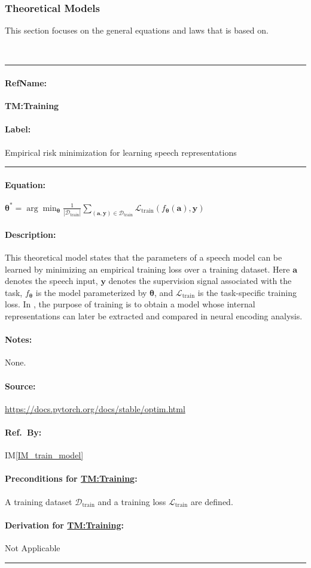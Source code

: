 \documentclass[12pt]{article}
\newcommand{\iref}[1]{IM\ref{#1}}
\newcommand{\deftheory}[9][Not Applicable]
{
\newpage
\noindent \rule{\textwidth}{0.5mm}

\paragraph{RefName: } \textbf{#2} \phantomsection 
\label{#2}

\paragraph{Label:} #3

\noindent \rule{\textwidth}{0.5mm}

\paragraph{Equation:}

#4

\paragraph{Description:}

#5

\paragraph{Notes:}

#6

\paragraph{Source:}

#7

\paragraph{Ref.\ By:}

#8

\paragraph{Preconditions for \hyperref[#2]{#2}:}
\label{#2_precond}

#9

\paragraph{Derivation for \hyperref[#2]{#2}:}
\label{#2_deriv}

#1

\noindent \rule{\textwidth}{0.5mm}

}
\begin{document}
\subsubsection{Theoretical Models}\label{sec_theoretical}



This section focuses on the general equations and laws that \progname{} is based
on.  

~\newline



\noindent
\deftheory
{TM:Training}
{Empirical risk minimization for learning speech representations}
{
  $
  \boldsymbol{\theta}^{\ast}
  =
  \arg\min_{\boldsymbol{\theta}}
  \frac{1}{|\mathcal{D}_{\text{train}}|}
  \sum_{(\boldsymbol{a}, \boldsymbol{y}) \in \mathcal{D}_{\text{train}}}
  \mathcal{L}_{\text{train}}\!\left(f_{\boldsymbol{\theta}}(\boldsymbol{a}), \boldsymbol{y}\right)
  $
}
{
  This theoretical model states that the parameters of a speech model can be learned
  by minimizing an empirical training loss over a training dataset.
  Here $\boldsymbol{a}$ denotes the speech input, $\boldsymbol{y}$ denotes the
  supervision signal associated with the task, $f_{\boldsymbol{\theta}}$ is the
  model parameterized by $\boldsymbol{\theta}$, and $\mathcal{L}_{\text{train}}$
  is the task-specific training loss. In \progname{}, the purpose of training is to
  obtain a model whose internal representations can later be extracted and compared
  in neural encoding analysis.
}
{None.}
{
  \url{https://docs.pytorch.org/docs/stable/optim.html}
}
{
  \iref{IM_train_model}
}
{
  A training dataset $\mathcal{D}_{\text{train}}$ and a training loss
  $\mathcal{L}_{\text{train}}$ are defined.
}
{}
\end{document}
